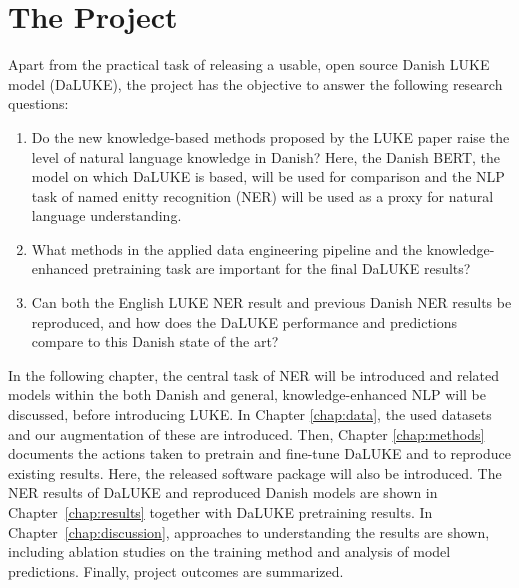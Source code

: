 \documentclass[main.tex]{subfiles}
\begin{document}
\section{The Project}%
\label{sec:project}
Apart from the practical task of releasing a usable, open source Danish LUKE model (DaLUKE), the project has the objective to answer the following research questions:
\begin{enumerate}[itemsep=.5em]
    \item
        Do the new knowledge-based methods proposed by the LUKE paper raise the level of natural language knowledge in Danish?
        Here, the Danish BERT, the model on which DaLUKE is based, will be used for comparison and the NLP task of named enitty recognition (NER) will be used as a proxy for natural language understanding.
    \item
        What methods in the applied data engineering pipeline and the knowledge-enhanced pretraining task are important for the final DaLUKE results?
    \item
        Can both the English LUKE NER result and previous Danish NER results be reproduced, and how does the DaLUKE performance and predictions compare to this Danish state of the art?
\end{enumerate}
In the following chapter, the central task of NER will be introduced and related models within the both Danish and general, knowledge-enhanced NLP will be discussed, before introducing LUKE.
In Chapter \ref{chap:data}, the used datasets and our augmentation of these are introduced.
Then, Chapter \ref{chap:methods} documents the actions taken to pretrain and fine-tune DaLUKE and to reproduce existing results.
Here, the released software package  will also be introduced.
The NER results of DaLUKE and reproduced Danish models are shown in Chapter~\ref{chap:results} together with DaLUKE pretraining results.
In Chapter~\ref{chap:discussion}, approaches to understanding the results are shown, including ablation studies on the training method and analysis of model predictions.
Finally, project outcomes are summarized.
\end{document}
